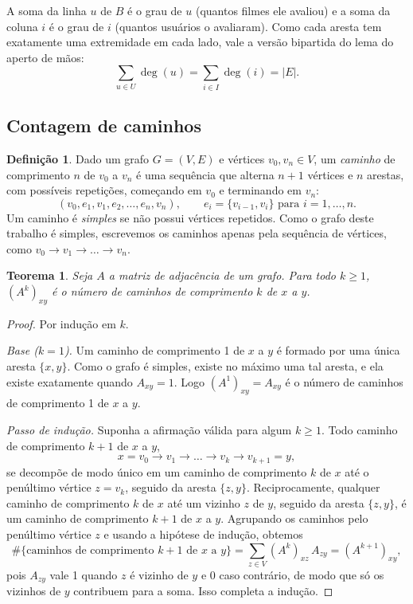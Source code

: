 \documentclass[12pt,a4paper]{article}
\newtheorem{teorema}{Teorema}
\theoremstyle{definition}
\newtheorem{definicao}{Definição}
\begin{document}
A soma da linha $u$ de $B$ é o grau de $u$ (quantos filmes ele avaliou) e a
soma da coluna $i$ é o grau de $i$ (quantos usuários o avaliaram). Como cada
aresta tem exatamente uma extremidade em cada lado, vale a versão bipartida
do lema do aperto de mãos:
\[
  \sum_{u \in U} \deg(u) = \sum_{i \in I} \deg(i) = |E|.
\]

\subsection{Contagem de caminhos}

\begin{definicao}
Dado um grafo $G = (V, E)$ e vértices $v_0, v_n \in V$, um \emph{caminho} de
comprimento $n$ de $v_0$ a $v_n$ é uma sequência que alterna $n+1$ vértices e
$n$ arestas, com possíveis repetições, começando em $v_0$ e terminando em
$v_n$:
\[
  (v_0, e_1, v_1, e_2, \dots, e_n, v_n), \qquad e_i = \{v_{i-1}, v_i\}
  \text{ para } i = 1, \dots, n.
\]
Um caminho é \emph{simples} se não possui vértices repetidos. Como o grafo
deste trabalho é simples, escrevemos os caminhos apenas pela sequência de
vértices, como $v_0 \to v_1 \to \dots \to v_n$.
\end{definicao}

\begin{teorema}\label{teo:caminhos}
Seja $A$ a matriz de adjacência de um grafo. Para todo $k \geq 1$,
$(A^k)_{xy}$ é o número de caminhos de comprimento $k$ de $x$ a $y$.
\end{teorema}

\begin{proof}
Por indução em $k$.

\emph{Base ($k = 1$).} Um caminho de comprimento 1 de $x$ a $y$ é formado
por uma única aresta $\{x, y\}$. Como o grafo é simples, existe no máximo
uma tal aresta, e ela existe exatamente quando $A_{xy} = 1$. Logo
$(A^1)_{xy} = A_{xy}$ é o número de caminhos de comprimento 1 de $x$ a $y$.

\emph{Passo de indução.} Suponha a afirmação válida para algum $k \geq 1$.
Todo caminho de comprimento $k+1$ de $x$ a $y$,
\[
  x = v_0 \to v_1 \to \dots \to v_k \to v_{k+1} = y,
\]
se decompõe de modo único em um caminho de comprimento $k$ de $x$ até o
penúltimo vértice $z = v_k$, seguido da aresta $\{z, y\}$. Reciprocamente,
qualquer caminho de comprimento $k$ de $x$ até um vizinho $z$ de $y$,
seguido da aresta $\{z, y\}$, é um caminho de comprimento $k+1$ de $x$ a
$y$. Agrupando os caminhos pelo penúltimo vértice $z$ e usando a hipótese
de indução, obtemos
\[
  \#\{\text{caminhos de comprimento } k+1 \text{ de } x \text{ a } y\}
  = \sum_{z \in V} (A^k)_{xz}\, A_{zy}
  = (A^{k+1})_{xy},
\]
pois $A_{zy}$ vale 1 quando $z$ é vizinho de $y$ e 0 caso contrário, de
modo que só os vizinhos de $y$ contribuem para a soma. Isso completa a
indução.
\end{proof}
\end{document}
